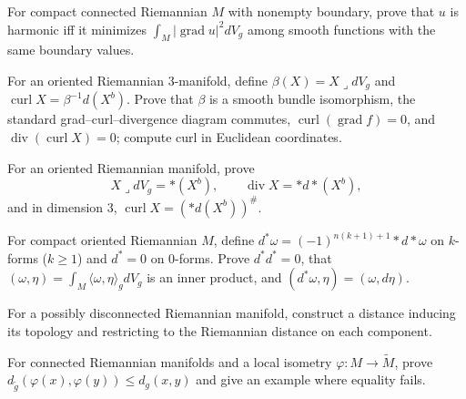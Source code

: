 \begin{exercise}
\label{prob:dirichlet-principle}
For compact connected Riemannian $M$ with nonempty boundary, prove that $u$ is harmonic iff it minimizes $\int_M|\operatorname{grad}u|^2dV_g$ among smooth functions with the same boundary values.
\end{exercise}

\begin{exercise}
\label{prob:curl-vector-field}
For an oriented Riemannian $3$-manifold, define $\beta(X)=X\lrcorner dV_g$ and $\operatorname{curl}X=\beta^{-1}d(X^b)$. Prove that $\beta$ is a smooth bundle isomorphism, the standard grad--curl--divergence diagram commutes, $\operatorname{curl}(\operatorname{grad}f)=0$, and $\operatorname{div}(\operatorname{curl}X)=0$; compute curl in Euclidean coordinates.
\end{exercise}

\begin{exercise}
\label{prob:hodge-star-exterior-derivative}
For an oriented Riemannian manifold, prove
\[
X\lrcorner dV_g=*(X^b),\qquad \operatorname{div}X=*d*(X^b),
\]
and in dimension $3$, $\operatorname{curl}X=(*d(X^b))^\#$.
\end{exercise}

\begin{exercise}
\label{prob:codifferential-operator}
For compact oriented Riemannian $M$, define $d^*\omega=(-1)^{n(k+1)+1}*d*\omega$ on $k$-forms ($k\ge1$) and $d^*=0$ on $0$-forms. Prove $d^*d^*=0$, that $(\omega,\eta)=\int_M\langle\omega,\eta\rangle_gdV_g$ is an inner product, and $(d^*\omega,\eta)=(\omega,d\eta)$.
\end{exercise}

\begin{exercise}\label{prob:distance-disconnected-riemannian}
For a possibly disconnected Riemannian manifold, construct a distance inducing its topology and restricting to the Riemannian distance on each component.
\end{exercise}

\begin{exercise}\label{prob:local-isometry-distance}
\leanok
For connected Riemannian manifolds and a local isometry $\varphi:M\to\widetilde M$, prove $d_{\widetilde g}(\varphi(x),\varphi(y))\le d_g(x,y)$ and give an example where equality fails.
\end{exercise}

